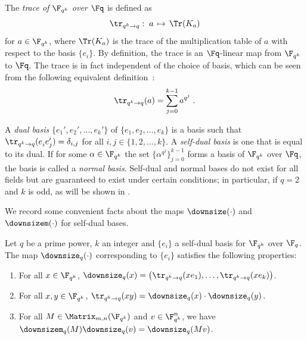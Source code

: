 The \emph{trace of\/ $\F_{q^k}$ over\/ $\Fq$} is defined as
\begin{equation}\label{eq:def-trace}
  \tr_{q^k \to q} :\; a \,\mapsto \, \Tr(K_a)
\end{equation}
for $a \in \F_{q^k}$, where $\Tr(K_a)$ is the trace of the multiplication table
of $a$ with respect to the basis $\{e_i\}$.
By definition, the trace is an $\Fq$-linear map from $\F_{q^k}$ to
$\Fq$. The trace is in fact independent of the choice of basis, which
can be seen from the following equivalent definition~\cite[Definition 2.1.80]{mullen2013handbook}:
\[
	\tr_{q^k \to q}(a) = \sum_{j = 0}^{k-1} a^{q^j}\;.
\]

A \emph{dual basis} $\{e_1', e_2', \ldots, e_k' \}$ of $\{e_1, e_2, \ldots,
e_k\}$ is a basis such that $\tr_{q^k \to q}(e^{}_i e'_j) = \delta_{i,j}$ for
all $i, j \in \{1, 2, \ldots, k\}$.
A \emph{self-dual basis} is one that is equal to its dual.
If for some $\alpha \in \F_{q^k}$ the set $\{ \alpha^{q^j} \}_{j=0}^{k-1}$ forms a
basis of $\F_{q^k}$ over $\Fq$, the basis is called a \emph{normal
  basis}. Self-dual and normal bases do not exist for all fields but are guaranteed to exist under
certain conditions; in particular, if $q = 2$ and $k$ is odd, as will
be shown in .

We record some convenient facts about the maps $\downsize(\cdot)$ and
$\downsizem(\cdot)$ for self-dual bases.

\begin{lemma}
  \label{lem:downsize_field}
  Let $q$ be a prime power, $k$ an integer and $\{e_i\}$ a self-dual basis for
  $\F_{q^k}$ over $\F_q$.
  The map $\downsize_q(\cdot)$ corresponding to $\{e_i\}$ satisfies the
  following properties:
  \begin{enumerate}
  \item For all $x \in \F_{q^k}$, $\downsize_q(x) = \bigl( \tr_{q^k \to
      q}(xe_1),\ldots,\tr_{q^k \to q}(xe_k) \bigr)$.
  \item For all $x,y \in \F_{q^k}$, $\tr_{q^k \to q}(xy) = \downsize_q(x) \cdot
    \downsize_q(y)$.
  \item For all $M \in \Matrix_{m, n}(\F_{q^k})$ and $v \in
    \F_{q^k}^n$, we have $\downsizem_q(M) \downsize_q(v) = \downsize_q(Mv)$.
  \end{enumerate}
\end{lemma}
 
